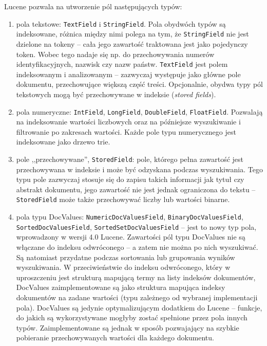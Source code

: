 Lucene pozwala na utworzenie pól następujących typów:
\begin{enumerate}
 \item pola tekstowe: \texttt{TextField} i \texttt{StringField}. Pola obydwóch typów są indeksowane, różnica między nimi polega na tym, że \texttt{StringField} nie jest dzielone na tokeny -- cała jego zawartość traktowana jest jako pojedynczy token. Wobec tego nadaje się np. do przechowywania numerów identyfikacyjnych, nazwisk czy nazw państw. \texttt{TextField} jest polem indeksowanym i analizowanym -- zazwyczaj występuje jako główne pole dokumentu, przechowujące większą część treści. Opcjonalnie, obydwa typy pól tekstowych mogą być przechowywane w indeksie (\emph{stored fields}).
 \item pola numeryczne: \texttt{IntField}, \texttt{LongField}, \texttt{DoubleField}, \texttt{FloatField}. Pozwalają na indeksowanie wartości liczbowych oraz na późniejsze wyszukiwanie i filtrowanie po zakresach wartości. Każde pole typu numerycznego jest indeksowane jako drzewo trie.
 \item pole ,,przechowywane'', \texttt{StoredField}: pole, którego pełna zawartość jest przechowywana w indeksie i może być odzyskana podczas wyszukiwania. Tego typu pole zazwyczaj stosuje się do zapisu takich informacji jak tytuł czy abstrakt dokumentu, jego zawartość nie jest jednak ograniczona do tekstu -- \texttt{StoredField} może także przechowywać liczby lub wartości binarne.
 \item pola typu DocValues: \texttt{NumericDocValuesField}, \texttt{BinaryDocValuesField}, \texttt{SortedDocValuesField}, \texttt{SortedSetDocValuesField} -- jest to nowy typ pola, wprowadzony w wersji 4.0 Lucene. Zawartości pól typu DocValues nie są włączane do indeksu odwróconego -- a zatem nie można po nich wyszukiwać. Są natomiast przydatne podczas sortowania lub grupowania wyników wyszukiwania. W przeciwieństwie do indeksu odwróconego, który w uproszczeniu jest strukturą mapującą termy na listy indeksów dokumentów, DocValues zaimplementowane są jako struktura mapująca indeksy dokumentów na zadane wartości (typu zależnego od wybranej implementacji pola). DocValues są jedynie optymalizującym dodatkiem do Lucene -- funkcje, do jakich są wykorzystywane mogłyby zostać spełnione przez pola innych typów. Zaimplementowane są jednak w sposób pozwajający na szybkie pobieranie przechowywanych wartości dla każdego dokumentu.
\end{enumerate}
